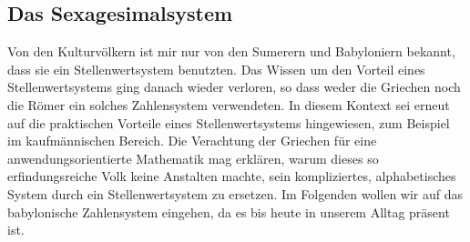 \documentclass[%
11pt,%
twoside,%
titlepage,%
german,%
]{scrartcl}
\begin{document}
\subsection{Das Sexagesimalsystem}

Von den Kulturv\"olkern ist mir nur von den Sumerern und Babyloniern bekannt, dass sie ein Stellenwertsystem benutzten. Das Wissen um den Vorteil eines Stellenwertsystems ging danach wieder verloren, so dass weder die Griechen noch die R\"omer ein solches Zahlensystem verwendeten. In diesem Kontext sei erneut auf die praktischen Vorteile eines Stellenwertsystems hingewiesen, zum Beispiel im kaufm\"annischen Bereich. Die Verachtung der Griechen f\"ur eine anwendungsorientierte Mathematik mag erkl\"aren, warum dieses so erfindungsreiche Volk keine Anstalten machte, sein kompliziertes, alphabetisches System durch ein Stellenwertsystem zu ersetzen. Im Folgenden wollen wir auf das babylonische Zahlensystem eingehen, da es bis heute in unserem Alltag pr\"asent ist.
\end{document}
